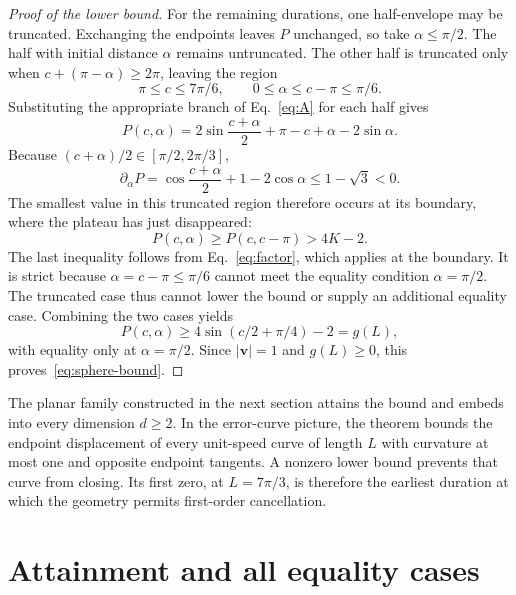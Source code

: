 \documentclass[12pt]{iopjournal}
\newcommand{\vvec}{\mathbf v}
\begin{document}
\begin{proof}[Proof of the lower bound]
For the remaining durations, one half-envelope may be truncated.
Exchanging the endpoints leaves $P$ unchanged, so take
$\alpha\le\pi/2$. The half with initial distance $\alpha$ remains
untruncated. The other half is truncated only when
$c+(\pi-\alpha)\ge2\pi$, leaving the region
\begin{equation}
 \pi\le c\le7\pi/6,\qquad 0\le\alpha\le c-\pi\le\pi/6.
 \label{eq:cap-region}
\end{equation}
Substituting the appropriate branch of Eq.~\eqref{eq:A} for each
half gives
\begin{equation}
 P(c,\alpha)=2\sin\frac{c+\alpha}{2}
              +\pi-c+\alpha-2\sin\alpha.
\end{equation}
Because $(c+\alpha)/2\in[\pi/2,2\pi/3]$,
\begin{equation}
 \partial_\alpha P
 =\cos\frac{c+\alpha}{2}+1-2\cos\alpha
 \le1-\sqrt3<0.
 \label{eq:cap-monotonicity}
\end{equation}
The smallest value in this truncated region therefore occurs at its
boundary, where the plateau has just disappeared:
\begin{equation*}
 P(c,\alpha)\ge P(c,c-\pi)>4K-2.
\end{equation*}
The last inequality follows from Eq.~\eqref{eq:factor}, which applies
at the boundary. It is strict because $\alpha=c-\pi\le\pi/6$ cannot
meet the equality condition $\alpha=\pi/2$. The truncated case thus
cannot lower the bound or supply an additional equality case.
Combining the two cases yields
\begin{equation}
 P(c,\alpha)\ge4\sin(c/2+\pi/4)-2=g(L),
 \label{eq:scalar-bound}
\end{equation}
with equality only at $\alpha=\pi/2$. Since $|\vvec|=1$ and
$g(L)\ge0$, this proves~\eqref{eq:sphere-bound}.
\end{proof}

The planar family constructed in the next section attains the bound
and embeds into every dimension $d\ge2$.
In the error-curve picture, the theorem bounds the endpoint displacement
of every unit-speed curve of length $L$ with curvature at most one and
opposite endpoint tangents. A nonzero lower bound prevents that curve
from closing. Its first zero, at $L=7\pi/3$, is therefore the earliest
duration at which the geometry permits first-order cancellation.

\section{Attainment and all equality cases}
\label{sec:attainment}
\end{document}
